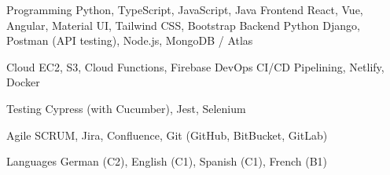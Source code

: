 

\begin{cvskills}

  \cvskill
    {Programming}
    {Python, TypeScript, JavaScript, Java}
  \cvskill
    {Frontend} %
    {React, Vue, Angular, Material UI, Tailwind CSS, Bootstrap}
  \cvskill
    {Backend}
    {Python Django, Postman (API testing), Node.js, MongoDB / Atlas}

  \cvskill
    {Cloud} 
    {EC2, S3, Cloud Functions, Firebase}
  \cvskill
    {DevOps}
    {CI/CD Pipelining, Netlify, Docker}
    
  \cvskill
    {Testing}
    {Cypress (with Cucumber), Jest, Selenium}

  \cvskill
    {Agile}
    {SCRUM, Jira, Confluence, Git (GitHub, BitBucket, GitLab)}

  \cvskill
    {Languages}
    {German (C2), English (C1), Spanish (C1), French (B1)}

\end{cvskills}

